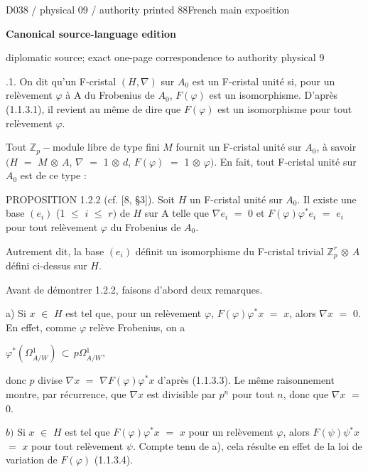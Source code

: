 \documentclass[9pt]{article}
\newcommand{\CanonHeading}[1]{\par\vspace{1.5pt}{\fontsize{8.6}{10.0}\selectfont\sffamily\bfseries\color{Accent} #1\par}\vspace{1.5pt}}
\newcommand{\CanonText}[1]{\par{\fontsize{8.0}{9.35}\selectfont\RaggedRight #1\par}\vspace{2.2pt}}
\newcommand{\CanonDisplay}[1]{\par\vspace{1.2pt}\begin{center}{\fontsize{7.2}{8.4}\selectfont\(\displaystyle #1\)}\end{center}\vspace{1.2pt}}
\newcommand{\LayerTitle}{Canonical source-language edition}
\begin{document}
\noindent\begin{minipage}[t][\dimexpr\textheight-5pt\relax][t]{\textwidth}
{\sffamily\fontsize{7.3}{8.2}\selectfont\color{Quiet} D038 / physical 09 / authority printed 88\hfill French main exposition}
\par{}\vspace{4.5pt}
{\sffamily\fontsize{10.4}{11.6}\selectfont\bfseries\color{Accent} \LayerTitle}
\par{\sffamily\fontsize{6.7}{7.7}\selectfont\color{Quiet} diplomatic source; exact one-page correspondence to authority physical 9}
\vspace{5pt}
\CanonHeading{1.2. F-cristaux unités.}
\CanonText{1.2.1. On dit qu'un F-cristal \((H,\nabla{})\) sur \(A_{0}\) est un F-cristal unité si, pour un relèvement \(\varphi{}\) à A du Frobenius de \(A_{0}\), \(F(\varphi{})\) est un isomorphisme. D'après (1.1.3.1), il revient au même de dire que \(F(\varphi{})\) est un isomorphisme pour tout relèvement \(\varphi{}\).}
\CanonText{Tout \(\mathbb{Z}_{p}-\text{module}\) libre de type fini \(M\) fournit un F-cristal unité sur \(A_{0}\), à savoir \((H\) \(=\) \(M\) \(\otimes{}\) \(A\), \(\nabla{}\) \(=\) 1 \(\otimes{}\) \(d\), \(F(\varphi{})\) \(=\) 1 \(\otimes{}\) \(\varphi{})\). En fait, tout F-cristal unité sur \(A_{0}\) est de ce type :}
\CanonText{PROPOSITION 1.2.2 (cf. [8, §3]). Soit \(H\) un F-cristal unité sur \(A_{0}\). Il existe une base \((e_{i})\) (1 \(\leq{}\) \(i\) \(\leq{}\) \(r)\) de \(H\) sur A telle que \(\nabla{}e_{i}\) \(=\) 0 et \(F(\varphi{})\varphi{}^{*}e_{i}\) \(=\) \(e_{i}\) pour tout relèvement \(\varphi{}\) du Frobenius de \(A_{0}\).}
\CanonText{Autrement dit, la base \((e_{i})\) définit un isomorphisme du F-cristal trivial \(\mathbb{Z}_{p}^{r}\) \(\otimes{}\) \(A\) défini ci-dessus sur \(H\).}
\CanonText{Avant de démontrer 1.2.2, faisons d'abord deux remarques.}
\CanonText{a) Si \(x\) \(\in{}\) \(H\) est tel que, pour un relèvement \(\varphi{}\), \(F(\varphi{})\varphi{}^{*}x\) \(=\) \(x\), alors \(\nabla{}x\) \(=\) 0. En effet, comme \(\varphi{}\) relève Frobenius, on a}
\CanonDisplay{\varphi{}^{*}(\Omega{}^{1}_{A/W})\,\subset{}\,p\Omega{}^{1}_{A/W},}
\CanonText{donc \(p\) divise \(\nabla{}x\) \(=\) \(\nabla{}F(\varphi{})\varphi{}^{*}x\) d'après (1.1.3.3). Le même raisonnement montre, par récurrence, que \(\nabla{}x\) est divisible par \(p^{n}\) pour tout \(n\), donc que \(\nabla{}x\) \(=\) 0.}
\CanonText{\(b)\) Si \(x\) \(\in{}\) \(H\) est tel que \(F(\varphi{})\varphi{}^{*}x\) \(=\) \(x\) pour un relèvement \(\varphi{}\), alors \(F(\psi{})\psi{}^{*}x\) \(=\) \(x\) pour tout relèvement \(\psi{}\). Compte tenu de a), cela résulte en effet de la loi de variation de \(F(\varphi{})\) (1.1.3.4).}

\end{minipage}
\end{document}
